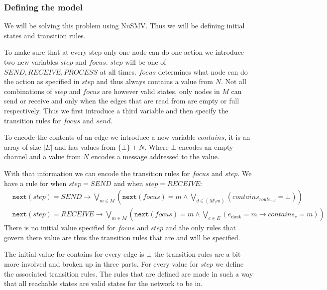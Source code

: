 \documentclass[12pt]{scrartcl}
\newcommand{\mtt}[1]{\ensuremath{\mathtt{#1}}}
\newcommand{\nt}[1]{\ensuremath{\mtt{next}(#1)}}
\begin{document}
\subsubsection{Defining the model}
We will be solving this problem using NuSMV. Thus we will be defining initial states and transition rules.

To make sure that at every step only one node can do one action we introduce two new variables $step$ and $focus$. $step$ will be one of $SEND, RECEIVE, PROCESS$ at all times. $focus$ determines what node can do the action as specified in $step$ and thus always contains a value from $N$. Not all combinations of $step$ and $focus$ are however valid states, only nodes in $M$ can send or receive and only when the edges that are read from are empty or full respectively. Thus we first introduce a third variable and then specify the transition rules for $focus$ and $send$.

To encode the contents of an edge we introduce a new variable $contains$, it is an array of size $|E|$ and has values from $\{\bot\} + N$. Where $\bot$ encodes an empty channel and a value from $N$ encodes a message addressed to the value.

With that information we can encode the transition rules for $focus$ and $step$. We have a rule for when $step = SEND$ and when $step = RECEIVE$:
\begin{align*}
    &\nt{step} = SEND \rightarrow \bigvee_{m\in M}\left( \nt{focus} = m \wedge \bigvee_{d\in (M\setminus m)}\left(contains_{route_{md}} = \bot\right)\right) \\
    &\nt{step} = RECEIVE \rightarrow \bigvee_{m\in M}\left( \nt{focus} = m \wedge \bigvee_{e\in E}\left(e_{\mtt{dest}} = m \rightarrow contains_{e} = m\right)\right)
\end{align*}
There is no initial value specified for $focus$ and $step$ and the only rules that govern there  value are thus the transition rules that are and will be specified.

The initial value for contains for every edge is $\bot$ the transition rules are a bit more involved and broken up in three parts. For every value for $step$ we define the associated transition rules. The rules that are defined are made in such a way that all reachable states are valid states for the network to be in.
\end{document}
